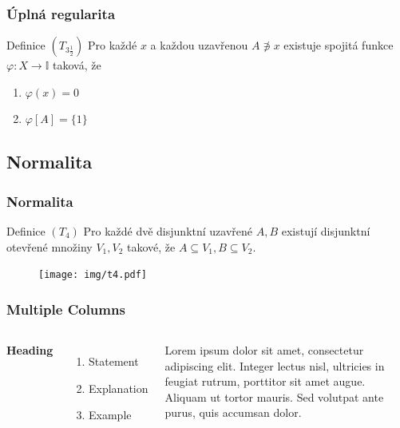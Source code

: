 \documentclass[mathserif]{beamer}
\begin{document}

\begin{frame}
\frametitle{Úplná regularita}

\newcommand{\I}{\mathbb{I}}
\renewcommand{\phi}{\varphi}
\begin{block}{Definice $(T_{3\frac{1}{2}})$}
  Pro každé $x$ a každou uzavřenou $A \not\owns x$ existuje spojitá funkce 
  $\phi\colon X \to \I$ taková, že
  \begin{enumerate}
    \item $\phi(x) = 0$
    \item $\phi[A] = \{1\}$
  \end{enumerate}
\end{block}

\end{frame}


\subsection{Normalita}

\begin{frame}
\frametitle{Normalita}
\begin{block}{Definice $(T_4)$}
  Pro každé dvě disjunktní uzavřené $A, B$ existují disjunktní otevřené množiny
  $V_1, V_2$ takové, že $A \subseteq V_1, B \subseteq V_2$.
\end{block}

\begin{figure}
  \texttt{[image: img/t4.pdf]}
\end{figure}

\end{frame}


\begin{frame}
\frametitle{Multiple Columns}
\begin{columns}[c] %

\textbf{Heading}
\begin{enumerate}
\item Statement
\item Explanation
\item Example
\end{enumerate}

Lorem ipsum dolor sit amet, consectetur adipiscing elit. Integer lectus nisl, ultricies in feugiat rutrum, porttitor sit amet augue. Aliquam ut tortor mauris. Sed volutpat ante purus, quis accumsan dolor.

\end{columns}
\end{frame}
\end{document}
